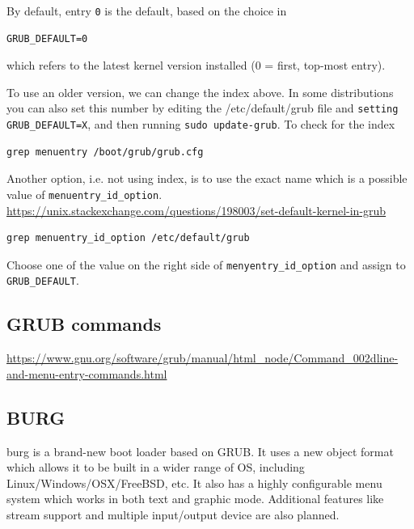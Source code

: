 By default, entry \verb!0! is the default, based on the choice in
\begin{verbatim}
GRUB_DEFAULT=0
\end{verbatim}
which refers to the latest kernel version installed (0 = first, top-most entry).  

To use an older version, we can change the index above. 
In some distributions you can also set this number by editing the
/etc/default/grub file and \verb!setting GRUB_DEFAULT=X!, and then running
\verb!sudo update-grub!. To check for the index
\begin{verbatim}
grep menuentry /boot/grub/grub.cfg
\end{verbatim}
  
Another option, i.e. not using index, is to use the exact name which is a
possible value of \verb!menuentry_id_option!.
\url{https://unix.stackexchange.com/questions/198003/set-default-kernel-in-grub}
%   

\begin{verbatim}
grep menuentry_id_option /etc/default/grub
\end{verbatim}
Choose one of the value on the right side of \verb!menyentry_id_option! and
assign to \verb!GRUB_DEFAULT!.
  
  
\subsection{GRUB commands}

\url{https://www.gnu.org/software/grub/manual/html_node/Command_002dline-and-menu-entry-commands.html}

\subsection{BURG}
\label{sec:BURG}

burg is a brand-new boot loader based on GRUB. It uses a new object format which
allows it to be built in a wider range of OS, including
Linux/Windows/OSX/FreeBSD, etc. It also has a highly configurable menu system
which works in both text and graphic mode. Additional features like stream
support and multiple input/output device are also planned.


